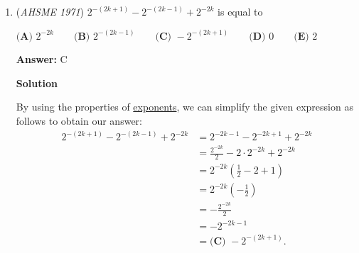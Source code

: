 \begin{enumerate}
 \textbf{Answer: }E



\textbf{Solution}

$\textbf{(A) }\ast\text{ is commutative over }S$
 \[a \ast b = b \ast a = 2ab\]Statement A is true.

 


 $\textbf{(B) }\ast\text{ is associative over }S$
 \[a \ast (b \ast c) = a \ast 2bc = 2a2bc = 4abc\]
 \[(a \ast b) \ast c = 2ab \ast c = 2(2ab)(c) = 4abc\]Statement B is true.

 
$\textbf{(C) }\frac{1}{2}\text{ is an identity element for }\ast\text{ in }S\qquad$
 \[a \ast \frac{1}{2} = a\]Statement C is true.

 $\textbf{(D) }\text{From the previous answer choice, we know }\frac{1}{2}\text{ is the identity element for }\ast\text{ in }S.\qquad$$\text{For inverses to exist, they must evaluate to the identity under the operator }\ast.\text{ Thus, } a \ast b = \frac{1}{2}\text{, which leads to } b = \frac{1}{4a}$

 Statement D is true.

 
$\textbf{(E) }\dfrac{1}{2a}\text{ is an inverse for }\ast\text{ of the element }a\text{ of }S$
 \[\frac{1}{2a} \ast a = 1\]

 Since the identity is $\frac{1}{2}$, not 1, we can see that statement E is false.

 Hence, the answer is $\boxed{\textbf{(E)}}$.

 -edited by coolmath34-fixed by DoctorSeventeen

 


	\item (\textit{AHSME 1971}) $2^{-(2k+1)}-2^{-(2k-1)}+2^{-2k}$ is equal to 


 $\textbf{(A) }2^{-2k}\qquad \textbf{(B) }2^{-(2k-1)}\qquad \textbf{(C) }-2^{-(2k+1)}\qquad \textbf{(D) }0\qquad  \textbf{(E) }2$

 \textbf{Answer: }C



\textbf{Solution}

By using the properties of \href{https://artofproblemsolving.com/wiki/index.php?title=Exponentiation\#Basic\_Properties}{exponents}, we can simplify the given expression as follows to obtain our answer:\begin{align*}2^{-(2k+1)} - 2^{-(2k-1)} + 2^{-2k} &= 2^{-2k-1} - 2^{-2k+1} + 2^{-2k} \\&= \frac{2^{-2k}}2 - 2\cdot2^{-2k} + 2^{-2k} \\&= 2^{-2k}(\frac12 - 2 + 1) \\&= 2^{-2k}(-\frac12) \\&= -\frac{2^{-2k}}2 \\&= -2^{-2k-1} \\&= \boxed{\textbf{(C) }-2^{-(2k+1)}}.\end{align*}



\end{enumerate}
